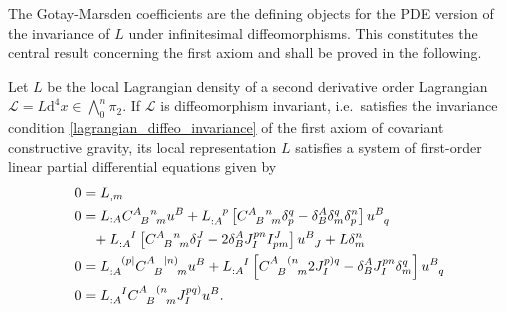 The Gotay-Marsden coefficients are the defining objects for the PDE version of the invariance of $L$ under infinitesimal diffeomorphisms. This constitutes the central result concerning the first axiom and shall be proved in the following.

\begin{theorem}\label{equivariance_eqns_thm}
  Let $L$ be the local Lagrangian density of a second derivative order Lagrangian $\mathscr L = L\mathrm d^4x \in \textstyle\bigwedge_0^n\pi_2$. If $\mathscr L$ is diffeomorphism invariant, i.e.\ satisfies the invariance condition \eqref{lagrangian_diffeo_invariance} of the first axiom of covariant constructive gravity, its local representation $L$ satisfies a system of first-order linear partial differential equations given by
  \begin{subequations}\label{equivariance_eqns}
    \begin{align}
      0 &{} = L_{,m} \label{equivariance_eqn_1}\\
      0 &{} = L_{:A} \gmc{A}{B}{n}{m}u^B + L_{:A}^{\hphantom{:A}p}\left\lbrack\gmc{A}{B}{n}{m} \delta^q_p - \delta^A_B\delta^q_m\delta^n_p\right\rbrack u^{B}_{\hphantom Bq} \nonumber \\
        &{} \hphantom{=} + L_{:A}^{\hphantom{:A}I} \left\lbrack\gmc{A}{B}{n}{m} \delta^J_I - 2 \delta^A_B J^{pn}_{I} I^J_{pm}\right\rbrack u^B_{\hphantom BJ} + L\delta^n_m \label{equivariance_eqn_2}\\
      0 &{} = L_{:A}^{\hphantom{:A}(p\mid} \gmc{A}{B}{\mid n)}{m} u^B + L_{:A}^{\hphantom{:A}I}\left\lbrack\gmc{A}{B}{(n}{m} 2J^{p)q}_I - \delta^A_B J^{pn}_I \delta^q_m\right\rbrack u^B_{\hphantom Bq} \label{equivariance_eqn_3}\\
      0 &{} = L_{:A}^{\hphantom{:A}I} \gmc{A}{B}{(n}{m} J^{pq)}_I u^B.\label{equivariance_eqn_4}
    \end{align}
  \end{subequations}
\end{theorem}
